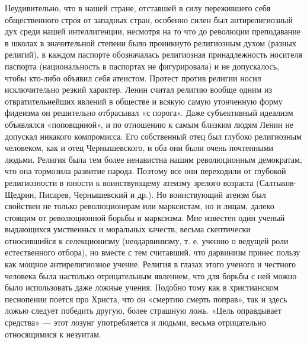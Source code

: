 Неудивительно,  что  в  нашей  стране, отставшей  в  силу  пережившего
себя  общественного  строя  от  западных  стран,  особенно  силен  был
антирелигиозный дух среди  нашей интеллигенции, несмотря на  то что до
революции преподавание в школах в значительной степени было проникнуто
религиозным  духом (разных  религий), в  каждом паспорте  обозначалась
религиозная   принадлежность  носителя   паспорта  (национальность   в
паспортах не  фигурировала) и  не допускалось, чтобы  кто-либо объявил
себя  атеистом.  Протест  против религии  носил  исключительно  резкий
характер.  Ленин  считал  религию вообще  одним  из  отвратительнейших
явлений  в   обществе  и   всякую  самую  утонченную   форму  фидеизма
он  решительно  отбрасывал  «с  порога».  Даже  субъективный  идеализм
объявлялся «поповщиной», и по отношению к самым близким людям Ленин не
допускал  никакого  компромисса.  Его  собственный  отец  был  глубоко
религиозным  человеком,  как и  отец  Чернышевского,  и оба  они  были
очень  почтенными  людьми. Религия  была  тем  более ненавистна  нашим
революционным демократам,  что она тормозила развитие  народа. Поэтому
все они переходили от глубокой  религиозности в юности к воинствующему
атеизму  зрелого возраста  (Салтыков-Щедрин,  Писарев, Чернышевский  и
др.). Но  воинствующий атеизм  был свойствен не  только революционерам
или марксистам,  но и  лицам, далеко  стоящим от  революционной борьбы
и  марксизма.  Мне  известен   один  ученый  выдающихся  умственных  и
моральных  качеств, весьма  скептически  относившийся к  селекционизму
(неодарвинизму, т. е. учению о  ведущей роли естественного отбора), но
вместе  с  тем  считавший,  что дарвинизм  принес  пользу  как  мощное
антирелигиозное  учение. Религия  в  глазах этого  ученого и  честного
человека была настолько  отрицательным явлением, что для  борьбы с ней
можно  было  использовать  даже  ложные учения.  Подобно  тому  как  в
христианском  песнопении поется  про  Христа, что  он «смертию  смерть
поправ», так  и здесь  ложью следует  победить другую,  более страшную
ложь.  «Цель оправдывает  средства»  --- этот  лозунг употребляется  и
людьми, весьма отрицательно относящимися к иезуитам.

